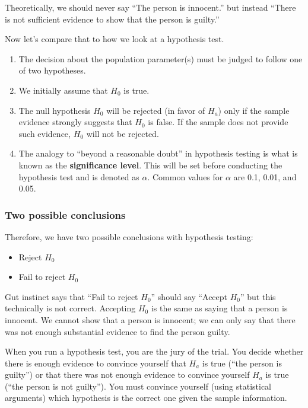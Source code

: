 \documentclass[12pt, krantz2,]{krantz}
\providecommand{\tightlist}{%
  \setlength{\itemsep}{0pt}\setlength{\parskip}{0pt}}
\begin{document}
Theoretically, we should never say ``The person is innocent.'' but instead ``There is not sufficient evidence to show that the person is guilty.''

Now let's compare that to how we look at a hypothesis test.

\begin{enumerate}
\def\labelenumi{\arabic{enumi}.}
\item
  The decision about the population parameter(s) must be judged to follow one of two hypotheses.
\item
  We initially assume that \(H_0\) is true.
\item
  The null hypothesis \(H_0\) will be rejected (in favor of \(H_a\)) only if the sample evidence strongly suggests that \(H_0\) is false. If the sample does not provide such evidence, \(H_0\) will not be rejected.
\item
  The analogy to ``beyond a reasonable doubt'' in hypothesis testing is what is known as the \textbf{significance level}. This will be set before conducting the hypothesis test and is denoted as \(\alpha\). Common values for \(\alpha\) are 0.1, 0.01, and 0.05.
\end{enumerate}

\hypertarget{two-possible-conclusions}{%
\subsubsection*{Two possible conclusions}\label{two-possible-conclusions}}


Therefore, we have two possible conclusions with hypothesis testing:

\begin{itemize}
\tightlist
\item
  Reject \(H_0\)\\
\item
  Fail to reject \(H_0\)
\end{itemize}

Gut instinct says that ``Fail to reject \(H_0\)'' should say ``Accept \(H_0\)'' but this technically is not correct. Accepting \(H_0\) is the same as saying that a person is innocent. We cannot show that a person is innocent; we can only say that there was not enough substantial evidence to find the person guilty.

When you run a hypothesis test, you are the jury of the trial. You decide whether there is enough evidence to convince yourself that \(H_a\) is true (``the person is guilty'') or that there was not enough evidence to convince yourself \(H_a\) is true (``the person is not guilty''). You must convince yourself (using statistical arguments) which hypothesis is the correct one given the sample information.
\end{document}
